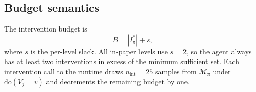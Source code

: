 \subsection{Budget semantics}
\label{app:instance:budget}

The intervention budget is
\begin{equation}
B = |I^*_\pi| + s,
\end{equation}
where $s$ is the per-level slack. All in-paper levels use $s = 2$, so the agent always has at least two interventions in excess of the minimum sufficient set. Each intervention call to the runtime draws $n_{\mathrm{int}} = 25$ samples from $\mathcal{M}_\pi$ under $\mathrm{do}(V_j = v)$ and decrements the remaining budget by one.
